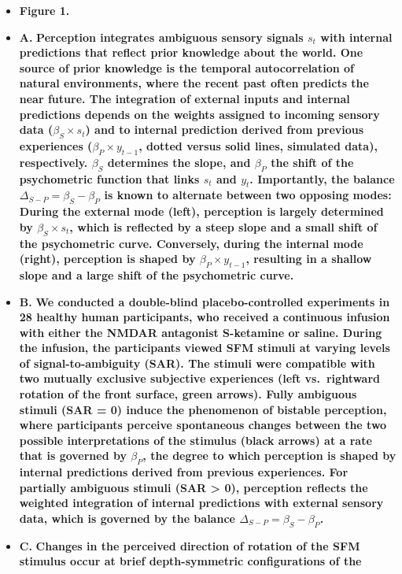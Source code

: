 \documentclass[
]{article}
\begin{document}
\begin{itemize}
\item
  \textbf{Figure 1.}
\item
  \textbf{A.} \textbf{Perception integrates ambiguous sensory signals
  \(s_t\) with internal predictions that reflect prior knowledge about
  the world. One source of prior knowledge is the temporal
  autocorrelation of natural environments, where the recent past often
  predicts the near future. The integration of external inputs and
  internal predictions depends on the weights assigned to incoming
  sensory data (\(\beta_S \times s_t\)) and to internal prediction
  derived from previous experiences (\(\beta_P \times y_{t-1}\), dotted
  versus solid lines, simulated data), respectively. \(\beta_S\)
  determines the slope, and \(\beta_P\) the shift of the psychometric
  function that links \(s_t\) and \(y_t\). Importantly, the balance
  \(\Delta_{S-P} = \beta_S - \beta_P\) is known to alternate between two
  opposing modes: During the external mode (left), perception is largely
  determined by \(\beta_S \times s_t\), which is reflected by a steep
  slope and a small shift of the psychometric curve. Conversely, during
  the internal mode (right), perception is shaped by
  \(\beta_P \times y_{t-1}\), resulting in a shallow slope and a large
  shift of the psychometric curve.}
\item
  \textbf{B.} \textbf{We conducted a double-blind placebo-controlled
  experiments in 28 healthy human participants, who received a
  continuous infusion with either the NMDAR antagonist S-ketamine or
  saline. During the infusion, the participants viewed SFM stimuli at
  varying levels of signal-to-ambiguity (SAR). The stimuli were
  compatible with two mutually exclusive subjective experiences (left
  vs.~rightward rotation of the front surface, green arrows). Fully
  ambiguous stimuli (SAR = 0) induce the phenomenon of bistable
  perception, where participants perceive spontaneous changes between
  the two possible interpretations of the stimulus (black arrows) at a
  rate that is governed by \(\beta_P\), the degree to which perception
  is shaped by internal predictions derived from previous experiences.
  For partially ambiguous stimuli (SAR \textgreater{} 0), perception
  reflects the weighted integration of internal predictions with
  external sensory data, which is governed by the balance
  \(\Delta_{S-P} = \beta_S - \beta_P\).}
\item
  \textbf{C.} \textbf{Changes in the perceived direction of rotation of
  the SFM stimulus occur at brief depth-symmetric configurations of the
}
\end{itemize}
\end{document}

